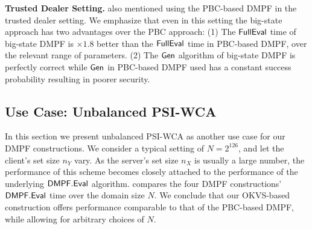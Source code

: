 {\bf Trusted Dealer Setting.} \cite{foleage} also mentioned using the PBC-based DMPF in the trusted dealer setting. 
We emphasize that even in this setting the big-state approach has two advantages over the PBC approach: (1) The ${\sf FullEval}$ time of big-state DMPF is $\times 1.8$ better than the ${\sf FullEval}$ time in PBC-based DMPF, over the relevant range of parameters. (2) The ${\sf Gen}$ algorithm of big-state DMPF is perfectly correct while ${\sf Gen}$ in PBC-based DMPF \cite{foleage} used has a constant success probability resulting in poorer security. 

\subsection{Use Case: Unbalanced PSI-WCA}
In this section we present unbalanced PSI-WCA as another use case for our DMPF constructions. 
We consider a typical setting of $N = 2^{126}$, and let the client's set size $n_Y$ vary. 
As the server's set size $n_X$ is usually a large number, the performance of this scheme becomes closely attached to the performance of the underlying ${\sf DMPF.Eval}$ algorithm.
 compares the four DMPF constructions' ${\sf DMPF.Eval}$ time over the domain size $N$. 
We conclude that our OKVS-based construction offers performance comparable to that of the PBC-based DMPF, while allowing for arbitrary choices of $N$. 